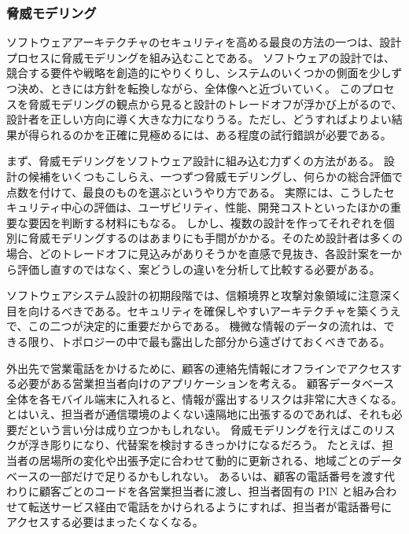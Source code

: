\documentclass[uplatex]{jsarticle}
\def\label#1{}%
\begin{document}
\subsubsection{脅威モデリング}\label{subsec:ch6-threat-modeling}

ソフトウェアアーキテクチャのセキュリティを高める最良の方法の一つは、設計プロセスに脅威モデリングを組み込むことである。
ソフトウェアの設計では、競合する要件や戦略を創造的にやりくりし、システムのいくつかの側面を少しずつ決め、ときには方針を転換しながら、全体像へと近づいていく。
このプロセスを脅威モデリングの観点から見ると設計のトレードオフが浮かび上がるので、設計者を正しい方向に導く大きな力になりうる。ただし、どうすればよりよい結果が得られるのかを正確に見極めるには、ある程度の試行錯誤が必要である。

まず、脅威モデリングをソフトウェア設計に組み込む力ずくの方法がある。
設計の候補をいくつもこしらえ、一つずつ脅威モデリングし、何らかの総合評価で点数を付けて、最良のものを選ぶというやり方である。
実際には、こうしたセキュリティ中心の評価は、ユーザビリティ、性能、開発コストといったほかの重要な要因を判断する材料にもなる。
しかし、複数の設計を作ってそれぞれを個別に脅威モデリングするのはあまりにも手間がかかる。そのため設計者は多くの場合、どのトレードオフに見込みがありそうかを直感で見抜き、各設計案を一から評価し直すのではなく、案どうしの違いを分析して比較する必要がある。

ソフトウェアシステム設計の初期段階では、信頼境界と攻撃対象領域に注意深く目を向けるべきである。セキュリティを確保しやすいアーキテクチャを築くうえで、この二つが決定的に重要だからである。
機微な情報のデータの流れは、できる限り、トポロジーの中で最も露出した部分から遠ざけておくべきである。

\begin{exa}[外回りの営業担当者向けアプリケーション]\label{exa:ch6-sales-app}
外出先で営業電話をかけるために、顧客の連絡先情報にオフラインでアクセスする必要がある営業担当者向けのアプリケーションを考える。
顧客データベース全体を各モバイル端末に入れると、情報が露出するリスクは非常に大きくなる。とはいえ、担当者が通信環境のよくない遠隔地に出張するのであれば、それも必要だという言い分は成り立つかもしれない。
脅威モデリングを行えばこのリスクが浮き彫りになり、代替案を検討するきっかけになるだろう。
たとえば、担当者の居場所の変化や出張予定に合わせて動的に更新される、地域ごとのデータベースの一部だけで足りるかもしれない。
あるいは、顧客の電話番号を渡す代わりに顧客ごとのコードを各営業担当者に渡し、担当者固有の PIN と組み合わせて転送サービス経由で電話をかけられるようにすれば、担当者が電話番号にアクセスする必要はまったくなくなる。
\end{exa}
\end{document}
